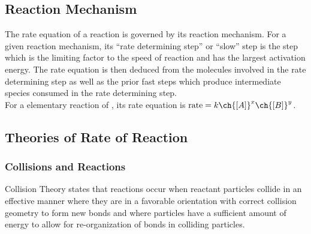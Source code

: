 \documentclass[../main]{subfiles}
\begin{document}
	\subsection{Reaction Mechanism}





	The rate equation of a reaction is governed by its reaction mechanism. For a given reaction mechanism, its ``rate determining step'' or ``slow'' step is the step which is the limiting factor to the speed of reaction and has the largest activation energy. The rate equation is then deduced from the molecules involved in the rate determining step as well as the prior fast steps which produce intermediate species consumed in the rate determining step. \\

	For a elementary reaction of , its rate equation is \( \text{rate} = k \ch{[A]}^x \ch{[B]}^y \).

	\subsection{Theories of Rate of Reaction}

	\subsubsection{Collisions and Reactions}

	Collision Theory states that reactions occur when reactant particles collide in an effective manner where they are in a favorable orientation with correct collision geometry to form new bonds and where particles have a sufficient amount of energy to allow for re-organization of bonds in colliding particles.
\end{document}

